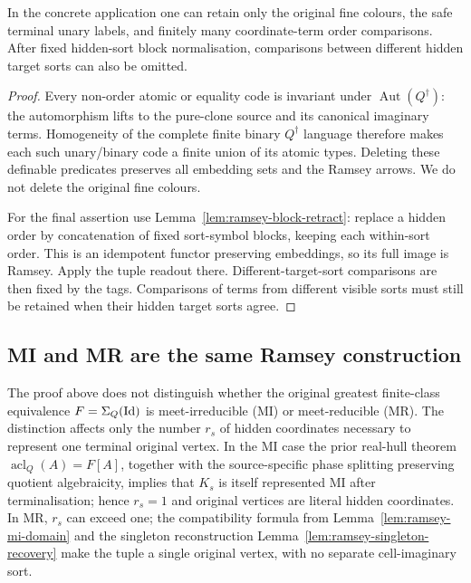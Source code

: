 \begin{corollary}\label{cor:ramsey-small-language}
In the concrete application one can retain only the original fine colours,
the safe terminal unary labels, and finitely many coordinate-term order
comparisons. After fixed hidden-sort block normalisation, comparisons between
different hidden target sorts can also be omitted.
\end{corollary}
\begin{proof}
Every non-order atomic or equality code is invariant under
$\operatorname{Aut}(Q^\dagger)$: the automorphism lifts to the pure-clone
source and its canonical imaginary terms. Homogeneity of the complete finite
binary $Q^\dagger$ language therefore makes each such unary/binary code a
finite union of its atomic types. Deleting these definable predicates
preserves all embedding sets and the Ramsey arrows. We do not delete the
original fine colours.

For the final assertion use Lemma~\ref{lem:ramsey-block-retract}: replace a hidden order
by concatenation of fixed sort-symbol blocks, keeping each within-sort order.
This is an idempotent functor preserving embeddings, so its full image is
Ramsey. Apply the tuple readout there. Different-target-sort comparisons are
then fixed by the tags. Comparisons of terms from different visible sorts
must still be retained when their hidden target sorts agree.
\end{proof}



\subsection{MI and MR are the same Ramsey construction}
The proof above does not distinguish whether the original greatest
finite-class equivalence $F=\Sigma_Q(\mathrm{Id})$ is meet-irreducible (MI)
or meet-reducible (MR).  The distinction affects only the number
$r_s$ of hidden coordinates necessary to represent one terminal
original vertex.  In the MI case the prior real-hull theorem
$\operatorname{acl}_Q(A)=F[A]$, together with the source-specific
phase splitting preserving quotient algebraicity, implies that
$K_s$ is itself represented MI after terminalisation; hence
$r_s=1$ and original vertices are literal hidden coordinates.
In MR, $r_s$ can exceed one; the compatibility formula from
Lemma~\ref{lem:ramsey-mi-domain} and the singleton reconstruction
Lemma~\ref{lem:ramsey-singleton-recovery} make the tuple a single
original vertex, with no separate cell-imaginary sort.

